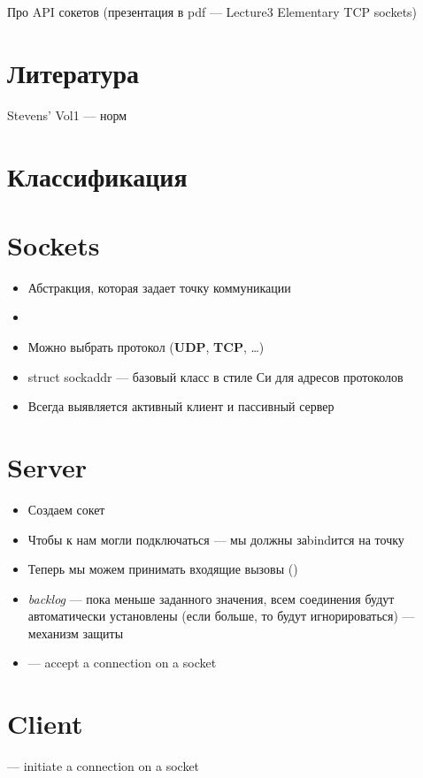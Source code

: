 Про API сокетов (презентация в pdf --- Lecture3 Elementary TCP sockets)

\section{Литература}
Stevens' Vol1 --- норм

\section{Классификация}

\section{Sockets}
\begin{itemize}
    \item Абстракция, которая задает точку коммуникации
    \item {}
    \item Можно выбрать протокол (\textbf{UDP}, \textbf{TCP}, \ldots)
    \item struct sockaddr --- базовый класс в стиле Си для адресов протоколов
    \item Всегда выявляется активный клиент и пассивный сервер
\end{itemize}

\section{Server}
\begin{itemize}
    \item Создаем сокет
    \item Чтобы к нам могли подключаться --- мы должны заbindится на точку\\
    \item Теперь мы можем принимать входящие вызовы ()
    \item \emph{backlog} --- пока меньше заданного значения, всем соединения будут 
          автоматически установлены (если больше, то будут игнорироваться) 
          --- механизм защиты
    \item {} --- accept a connection on a socket
\end{itemize}

\section{Client}
 --- initiate a connection on a socket

